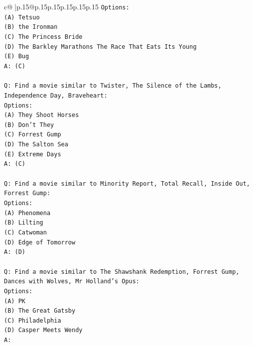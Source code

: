 \documentclass{article}
\begin{document}
{\begin{supertabular}{c@{$\;$}|p{.15\linewidth}@{}p{.15\linewidth}p{.15\linewidth}p{.15\linewidth}p{.15\linewidth}p{.15\linewidth}}
{{{\texttt{Options:} \\
\texttt{(A) Tetsuo} \\
\texttt{(B) the Ironman} \\
\texttt{(C) The Princess Bride} \\
\texttt{(D) The Barkley Marathons The Race That Eats Its Young} \\
\texttt{(E) Bug} \\
\texttt{A: (C)} \\
\\ 
\texttt{Q: Find a movie similar to Twister, The Silence of the Lambs, Independence Day, Braveheart:} \\
\texttt{Options:} \\
\texttt{(A) They Shoot Horses} \\
\texttt{(B) Don't They} \\
\texttt{(C) Forrest Gump} \\
\texttt{(D) The Salton Sea} \\
\texttt{(E) Extreme Days} \\
\texttt{A: (C)} \\
\\ 
\texttt{Q: Find a movie similar to Minority Report, Total Recall, Inside Out, Forrest Gump:} \\
\texttt{Options:} \\
\texttt{(A) Phenomena} \\
\texttt{(B) Lilting} \\
\texttt{(C) Catwoman} \\
\texttt{(D) Edge of Tomorrow} \\
\texttt{A: (D)} \\
\\ 
\texttt{Q: Find a movie similar to The Shawshank Redemption, Forrest Gump, Dances with Wolves, Mr Holland's Opus:} \\
\texttt{Options:} \\
\texttt{(A) PK} \\
\texttt{(B) The Great Gatsby} \\
\texttt{(C) Philadelphia} \\
\texttt{(D) Casper Meets Wendy} \\
\texttt{A:} \\
            }
        }
    }
     \\ \\


\end{supertabular}}
\end{document}

